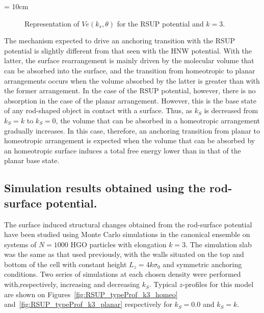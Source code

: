 \picW = 10cm
\begin{figure}
	\centering
	\caption{Representation of $Ve(k_s,\theta)$ for the RSUP potential and $k=3$.}
	\label{fig:Ve_RSUP_fks}
\end{figure}

The mechanism expected to drive an anchoring transition with the RSUP potential is slightly
different from that seen with the HNW potential. With the latter, the surface rearrangement 
is mainly driven
by the molecular volume that can be absorbed into the surface, and the transition
from homeotropic to planar arrangements occurs when the volume absorbed by the
latter is greater than with the former arrangement. In the case of the RSUP potential, however, 
there is
no absorption in the case of the planar arrangement. However, this is the base state of
any rod-shaped object in contact with a surface. Thus, as $k_S$ is decreased from  $k_S=k$ to $k_S=0$, 
the volume that can be absorbed in a homeotropic arrangement gradually increases. In this case,
therefore, an anchoring transition from planar to homeotropic arrangement 
is expected when the volume that can be absorbed by an homeotropic surface induces a total free energy
lower than in that of the planar base state.


\subsection{Simulation results obtained using the rod-surface potential.}

The surface induced structural changes obtained from the rod-surface potential have been studied using
Monte Carlo simulations in the canonical ensemble on systems of $N=1000$ HGO particles with 
elongation $k=3$. The simulation slab was the same as that used previously, with the walls situated 
on the top and bottom of the cell with constant height $L_z = 4k\sigma_0$ and symmetric 
anchoring conditions. Two series of simulations at each chosen density were performed 
with,respectively, increasing and decreasing $k_S$.
Typical $z$-profiles for this model are shown on Figures~\ref{fig:RSUP_typeProf_k3_homeo} 
and~\ref{fig:RSUP_typeProf_k3_planar} respectively for $k_S=0.0$ and $k_S = k$.\\

